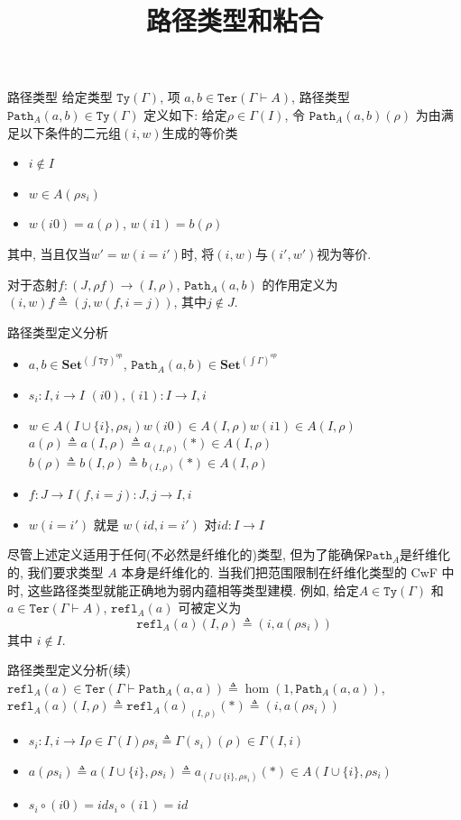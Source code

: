 \documentclass[aspectratio=169,xcolor=dvipsnames]{beamer}
\title{路径类型和粘合}
\date{}
\newcommand\Ty{\mathtt{Ty}}
\newcommand\Ter{\mathtt{Ter}}
\newcommand\Path{\mathtt{Path}}
\newcommand\Set{\mathbf{Set}}
\newcommand\refl{\mathtt{refl}}
\begin{document}
\begin{frame}
    \titlepage
\end{frame}

\begin{frame}[shrink]{路径类型}
给定类型 $\Ty(\Gamma)$, 项 $a,b\in\Ter(\Gamma\vdash A)$, 路径类型$\Path_{A}(a,b)\in\Ty(\Gamma)$ 定义如下: 给定$\rho\in\Gamma(I)$, 令 $\Path_{A}(a,b)(\rho)$ 为由满足以下条件的二元组$(i,w)$生成的等价类
\begin{itemize}
  \item $i\notin I$
  \item $w\in A(\rho s_{i})$
  \item $w(i0)=a(\rho)$, $w(i1)=b(\rho)$
\end{itemize}
其中, 当且仅当$w'=w(i=i')$时, 将$(i,w)$与$(i',w')$视为等价.

对于态射$f:(J,\rho f)\to(I,\rho)$, $\Path_{A}(a,b)$ 的作用定义为 $(i,w)f\triangleq(j,w(f,i=j))$, 其中$j\notin J$.
\end{frame}

\begin{frame}[shrink]{路径类型定义分析}
  \begin{itemize}
    \item $a,b \in \Set^{(\int\Ty)^{op}}$, $\Path_{A}(a,b)\in\Set^{(\int\Gamma)^{op}}$
    \item $s_{i} : I,i \to I$ \quad $(i0),(i1):I\to I,i$
    \item $w\in A(I\cup\{i\},\rho s_i)$\quad $w(i0)\in A(I,\rho)$\quad $w(i1)\in A(I,\rho)$\quad $a(\rho)\triangleq a(I,\rho)\triangleq a_{(I,\rho)}(\ast)\in A(I,\rho)$\quad $b(\rho)\triangleq b(I,\rho)\triangleq b_{(I,\rho)}(\ast)\in A(I,\rho)$
    \item $f:J\to I$\quad $(f,i=j) : J,j\to I,i$
    \item $w(i=i')$ 就是 $w(id,i=i')$ 对$id:I\to I$
  \end{itemize}

尽管上述定义适用于任何(不必然是纤维化的)类型, 但为了能确保$\Path_{A}$是纤维化的, 我们要求类型 $A$ 本身是纤维化的. 当我们把范围限制在纤维化类型的 CwF 中时, 这些路径类型就能正确地为弱内蕴相等类型建模. 例如, 给定$A\in\Ty(\Gamma)$ 和 $a\in\Ter(\Gamma\vdash A)$, $\refl_{A}(a)$ 可被定义为
\[ \refl_{A}(a)(I,\rho)\triangleq (i,a(\rho s_i))\]
其中 $i\notin I$.
\end{frame}

\begin{frame}{路径类型定义分析(续)}
  $\refl_{A}(a)\in\Ter(\Gamma\vdash \Path_{A}(a,a))\triangleq\hom(1,\Path_A(a,a))$, $\refl_A(a)(I,\rho)\triangleq\refl_{A}(a)_{(I,\rho)}(\ast)\triangleq(i,a(\rho s_i))$
  \begin{itemize}
    \item $s_i : I,i\to I$\quad $\rho\in\Gamma(I)$\quad $\rho s_i\triangleq \Gamma(s_i)(\rho)\in\Gamma(I,i)$
    \item $a(\rho s_i)\triangleq a(I\cup\{i\},\rho s_i)\triangleq a_{(I\cup\{i\},\rho s_i)}(\ast)\in A(I\cup\{i\},\rho s_i)$
    \item $s_i\circ (i0) = id$\quad $s_i\circ (i1) = id$
  \end{itemize}
\end{frame}
\end{document}
